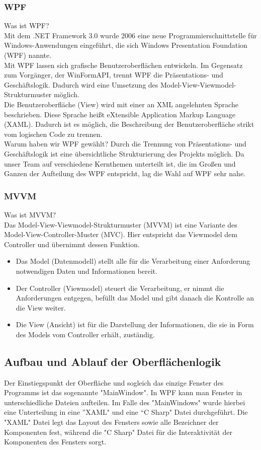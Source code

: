 \documentclass[12pt,a4paper,headinclude,twoside, plainheadsepline, open=right,numbers=noenddot]{scrreprt}
\begin{document}
\subsubsection{WPF}
Was ist WPF? \\
Mit dem .NET Framework 3.0 wurde 2006 eine neue Programmierschnittstelle für Windows-Anwendungen eingeführt, die sich Windows Presentation Foundation (WPF) nannte. \\
Mit WPF lassen sich grafische Benutzeroberflächen entwickeln. Im Gegensatz zum Vorgänger, der WinFormAPI, trennt WPF die Präsentations- und Geschäftslogik. Dadurch wird eine Umsetzung des Model-View-Viewmodel-Strukturmuster möglich.  \\
Die Benutzeroberfläche (View) wird mit einer an XML angelehnten Sprache beschrieben. Diese Sprache heißt eXtensible Application Markup Language (XAML). Dadurch ist es möglich, die Beschreibung der Benutzeroberfläche strikt vom logischen Code zu trennen\cite{Kühnel}. \\
Warum haben wir WPF gewählt?
Durch die Trennung von Präsentations- und Geschäftslogik ist eine übersichtliche Strukturierung des Projekts möglich. Da unser Team auf verschiedene Kernthemen unterteilt ist, die im Großen und Ganzen der Aufteilung des WPF entspricht, lag die Wahl auf WPF sehr nahe.

\subsubsection{MVVM}
Was ist MVVM? \\
Das Model-View-Viewmodel-Strukturmuster (MVVM) ist eine Variante des Model-View-Controller-Muster (MVC). Hier entspricht das Viewmodel dem Controller und übernimmt dessen Funktion. \\
\begin{itemize}
\item Das Model (Datenmodell) stellt alle für die Verarbeitung einer Anforderung notwendigen Daten und Informationen bereit.
\item Der Controller (Viewmodel) steuert die Verarbeitung, er nimmt die Anforderungen entgegen, befüllt das Model und gibt danach die Kontrolle an die View weiter.
\item Die View (Ansicht) ist für die Darstellung der Informationen, die sie in Form des Models vom Controller erhält, zuständig\cite{Kühnel}.
\end{itemize}

\subsection{Aufbau und Ablauf der Oberflächenlogik}
Der Einstiegspunkt der Oberfläche und sogleich das einzige Fenster des Programms ist das sogenannte "{}MainWindow"{}. In WPF kann man Fenster in unterschiedliche Dateien aufteilen. Im Falle des "{}MainWindows"{} wurde hierbei eine Unterteilung in eine ”{}XAML"{} und eine “{}C Sharp"{} Datei durchgeführt. Die "{}XAML"{} Datei legt das Layout des Fensters sowie alle Bezeichner der Komponenten fest, während die "{}C Sharp"{} Datei für die Interaktivität der Komponenten des Fensters sorgt. 
\end{document}

